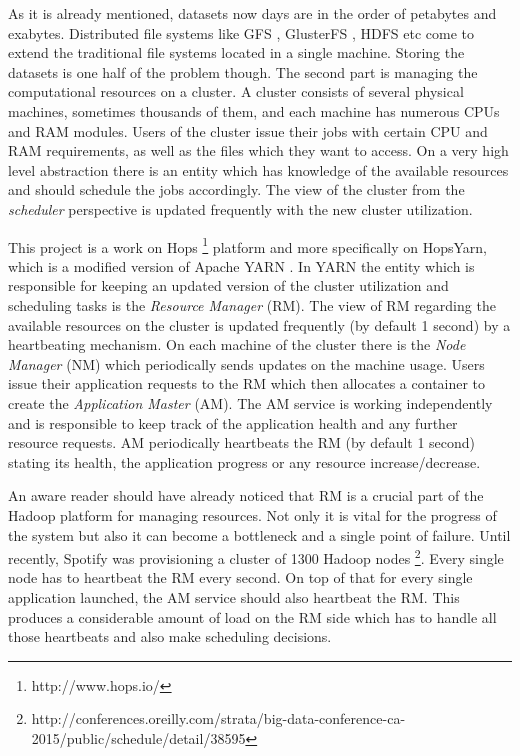 As it is already mentioned, datasets now days are in the order of
petabytes and exabytes. Distributed file systems like GFS
\cite{Ghemawat:2003:GFS:1165389.945450}, 
GlusterFS \cite{glusterfs}, HDFS \cite{hdfs} etc come to extend
the traditional file systems located in a single machine. Storing the
datasets is one half of the problem though. The second part is
managing the computational resources on a cluster. A cluster consists
of several physical machines, sometimes thousands of them, and each
machine has numerous CPUs and RAM modules. Users of the cluster issue
their jobs with certain CPU and RAM requirements, as well as the files
which they want to access. On a very high level abstraction there is
an entity which has knowledge of the available resources and should
schedule the jobs accordingly. The view of the cluster from the
\emph{scheduler} perspective is updated frequently with the new
cluster utilization.

This project is a work on Hops \footnote{http://www.hops.io/} platform
and more specifically on HopsYarn, which is a modified version of
Apache YARN \cite{Vavilapalli:2013:AHY:2523616.2523633}. In YARN the
entity which is responsible for keeping an updated version of the
cluster utilization and scheduling tasks is the \emph{Resource
Manager} (RM). The view of RM regarding the available resources on the
cluster is updated frequently (by default 1 second) by a heartbeating
mechanism. On each machine of the cluster there is the \emph{Node
Manager} (NM) which periodically sends updates on the machine
usage. Users issue their application requests to the RM which then
allocates a container to create the \emph{Application Master}
(AM). The AM service is working independently and is responsible to
keep track of the application health and any further resource
requests. AM periodically heartbeats the RM (by default 1 second)
stating its health, the application progress or any resource
increase/decrease.

An aware reader should have already noticed that RM is a crucial part
of the Hadoop platform for managing resources. Not only it is vital
for the progress of the system but also it can become a
bottleneck and a single point of failure. Until recently, Spotify was
provisioning a cluster of 1300
Hadoop nodes \footnote{http://conferences.oreilly.com/strata/big-data-conference-ca-2015/public/schedule/detail/38595}. Every single node has to heartbeat the RM every
second. On top of that for every single application launched, the AM
service should also heartbeat the RM. This produces a considerable
amount of load on the RM side which has to handle all those heartbeats
and also make scheduling decisions.

